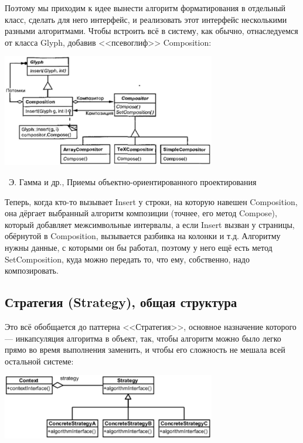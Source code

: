 \documentclass[a5paper]{article}
\newcommand{\attribution}[1] {
    \vspace{-5mm}\begin{flushright}\begin{scriptsize}%
    {\textcopyright\, #1}\end{scriptsize}\end{flushright}
}
\begin{document}
Поэтому мы приходим к идее вынести алгоритм форматирования в отдельный класс, сделать для него интерфейс, и реализовать этот интерфейс несколькими разными алгоритмами. Чтобы встроить всё в систему, как обычно, отнаследуемся от класса Glyph, добавив <<псевоглиф>> Composition:

\begin{center}
    \includegraphics[width=0.7\textwidth]{compositor.png}
    \attribution{Э. Гамма и др., Приемы объектно-ориентированного проектирования}
\end{center}

Теперь, когда кто-то вызывает Insert у строки, на которую навешен Composition, она дёргает выбранный алгоритм композиции (точнее, его метод Compose), который добавляет межсимвольные интервалы, а если Insert вызван у страницы, обёрнутой в Composition, вызывается разбивка на колонки и т.д. Алгоритму нужны данные, с которыми он бы работал, поэтому у него ещё есть метод SetComposition, куда можно передать то, что ему, собственно, надо композировать.

\subsection{Стратегия (Strategy), общая структура}

Это всё обобщается до паттерна <<Стратегия>>, основное назначение которого --- инкапсуляция алгоритма в объект, так, чтобы алгоритм можно было легко прямо во время выполнения заменить, и чтобы его сложность не мешала всей остальной системе:

\begin{center}
    \includegraphics[width=0.7\textwidth]{strategy.png}
\end{center}
\end{document}
